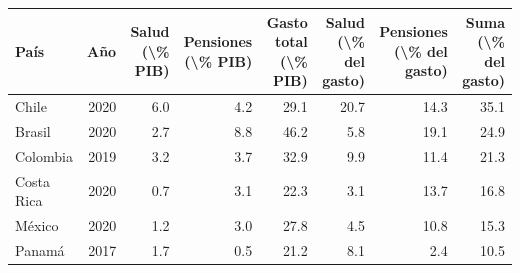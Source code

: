 
\begin{tabular}{lrrrrrrr}
\toprule
País & Año & Salud (\textbackslash{}\% PIB) & Pensiones (\textbackslash{}\% PIB) & Gasto total (\textbackslash{}\% PIB) & Salud (\textbackslash{}\% del gasto) & Pensiones (\textbackslash{}\% del gasto) & Suma (\textbackslash{}\% del gasto)\\
\midrule
Chile & 2020 & 6.0 & 4.2 & 29.1 & 20.7 & 14.3 & 35.1\\
Brasil & 2020 & 2.7 & 8.8 & 46.2 & 5.8 & 19.1 & 24.9\\
Colombia & 2019 & 3.2 & 3.7 & 32.9 & 9.9 & 11.4 & 21.3\\
Costa Rica & 2020 & 0.7 & 3.1 & 22.3 & 3.1 & 13.7 & 16.8\\
México & 2020 & 1.2 & 3.0 & 27.8 & 4.5 & 10.8 & 15.3\\
Panamá & 2017 & 1.7 & 0.5 & 21.2 & 8.1 & 2.4 & 10.5\\
\bottomrule
\end{tabular}